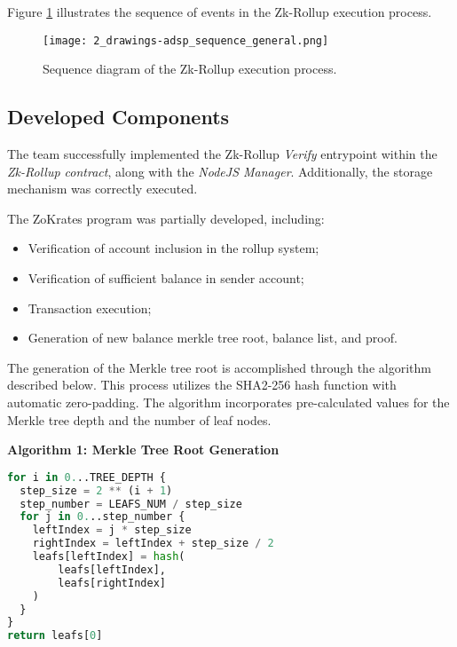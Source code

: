 Figure \ref{fig:2_drawings-adsp_sequence_general.png} illustrates the sequence of events in the Zk-Rollup execution process.

\begin{figure}[ht]
  \centering
  \texttt{[image: 2\_drawings-adsp\_sequence\_general.png]}
  \caption[Sequence Zk-Rollup]{Sequence diagram of the Zk-Rollup execution process.}  
  \label{fig:2_drawings-adsp_sequence_general.png}
\end{figure} 

\subsection{Developed Components}
The team successfully implemented the Zk-Rollup \textit{Verify} entrypoint within the \textit{Zk-Rollup contract}, along with the \textit{NodeJS Manager}. Additionally, the storage mechanism was correctly executed.

The ZoKrates program was partially developed, including:
\begin{itemize}
    \item Verification of account inclusion in the rollup system;
    \item Verification of sufficient balance in sender account;
    \item Transaction execution;
    \item Generation of new balance merkle tree root, balance list, and proof.
\end{itemize}

The generation of the Merkle tree root is accomplished through the algorithm described below. This process utilizes the SHA2-256 hash function with automatic zero-padding. The algorithm incorporates pre-calculated values for the Merkle tree depth and the number of leaf nodes.

\noindent\textbf{Algorithm 1: Merkle Tree Root Generation}
\begin{lstlisting}[language=Python]
for i in 0...TREE_DEPTH {
  step_size = 2 ** (i + 1)
  step_number = LEAFS_NUM / step_size
  for j in 0...step_number {
    leftIndex = j * step_size
    rightIndex = leftIndex + step_size / 2
    leafs[leftIndex] = hash(
        leafs[leftIndex],
        leafs[rightIndex]
    )
  }
}
return leafs[0]
\end{lstlisting}

